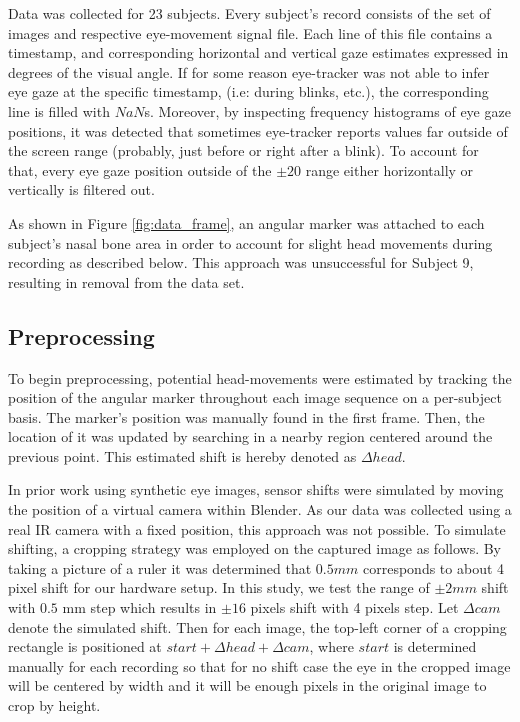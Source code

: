 Data was collected for 23 subjects. Every subject's record consists of the set of images and respective eye-movement signal file. Each line of this file contains a timestamp, and corresponding horizontal and vertical gaze estimates expressed in degrees of the visual angle. If for some reason eye-tracker was not able to infer eye gaze at the specific timestamp, (i.e: during blinks, etc.), the corresponding line is filled with $NaN$s. Moreover, by inspecting frequency histograms of eye gaze positions, it was detected that sometimes eye-tracker reports values far outside of the screen range (probably, just before or right after a blink). To account for that, every eye gaze position outside of the $\pm20$\textdegree{} range either horizontally or vertically is filtered out.    

As shown in Figure \ref{fig:data_frame}, an angular marker was attached to each subject's nasal bone area in order to account for slight head movements during recording as described below. This approach was unsuccessful for Subject 9, resulting in removal from the data set. 

\subsection{Preprocessing}

To begin preprocessing, potential head-movements were estimated by tracking the position of the angular marker throughout each image sequence on a per-subject basis. The marker's position was manually found in the first frame. Then, the location of it was updated by searching in a nearby region centered around the previous point. This estimated shift is hereby denoted as $\Delta head$. 

In prior work using synthetic eye images, sensor shifts were simulated by moving the position of a virtual camera within Blender. As our data was collected using a real IR camera with a fixed position, this approach was not possible. To simulate shifting, a cropping strategy was employed on the captured image as follows. By taking a picture of a ruler it was determined that $0.5mm$ corresponds to about 4 pixel shift for our hardware setup. In this study, we test the range of $\pm 2mm$ shift with $0.5$ mm step which results in $\pm 16$ pixels shift with 4 pixels step. Let $\Delta cam$ denote the simulated shift. Then for each image, the top-left corner of a cropping rectangle is positioned at $start + \Delta head + \Delta cam$, where $start$ is determined manually for each recording so that for no shift case the eye in the cropped image will be centered by width and it will be enough pixels in the original image to crop by height. 

